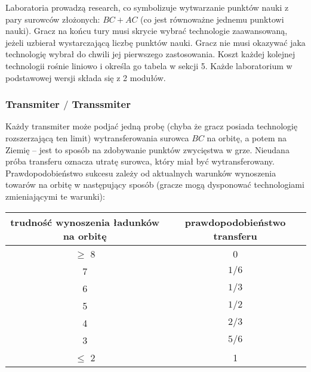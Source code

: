 \documentclass[11pt,a4paper]{article}
\begin{document}
Laboratoria prowadzą research, co symbolizuje wytwarzanie punktów nauki z pary surowców złożonych: $BC + AC$ (co jest równoważne jednemu punktowi nauki). Gracz na końcu tury musi skrycie wybrać technologie zaawansowaną, jeżeli uzbierał wystarczającą liczbę punktów nauki. Gracz nie musi okazywać jaka technologię wybrał do chwili jej pierwszego zastosowania. Koszt każdej kolejnej technologii rośnie liniowo i określa go tabela w sekcji 5. Każde laboratorium w podstawowej wersji składa się z 2 modułów. 

\subsubsection{Transmiter $/$ Transsmiter}

Każdy transmiter może podjać jedną probę (chyba że gracz posiada technologię rozszerzającą ten limit) wytransferowania surowca $BC$ na orbitę, a potem na Ziemię -- jest to sposób na zdobywanie punktów zwycięstwa w grze. Nieudana próba transferu oznacza utratę surowca, który miał być wytransferowany. Prawdopodobieństwo sukcesu zależy od aktualnych warunków wynoszenia towarów na orbitę w następujący sposób (gracze mogą dysponować technologiami zmieniającymi te warunki):
\begin{center}
  \begin{tabular}{| c | c |}
    \hline
    \textbf{trudność wynoszenia ładunków na orbitę} & \textbf{prawdopodobieństwo transferu}\\
    \hline
     $\ge$ 8 & 0 \\
    \hline
    7 & $1/6$ \\
    \hline
    6 & $1/3$ \\
    \hline
    5 & $1/2$ \\
    \hline
    4 & $2/3$ \\
    \hline
    3 & $5/6$ \\
    \hline
     $\le$ 2  & 1 \\
    \hline
  \end{tabular}
\end{center}
\end{document}

